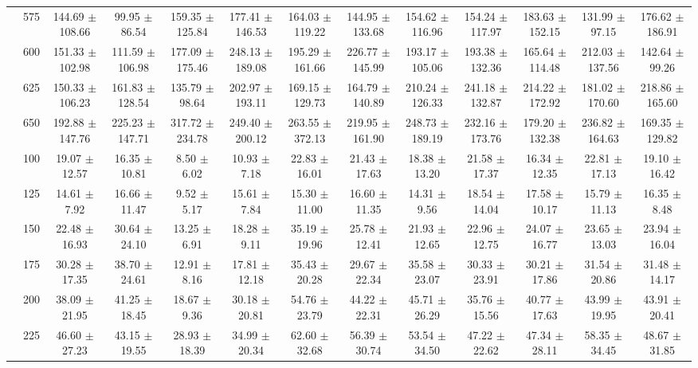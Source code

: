 \begin{table}[h]
{\begin{tabular}{
        ccccccccccccc}
 & 575& 144.69 $\pm$ 108.66& 99.95 $\pm$ 86.54& 159.35 $\pm$ 125.84& 177.41 $\pm$ 146.53& 164.03 $\pm$ 119.22& 144.95 $\pm$ 133.68& 154.62 $\pm$ 116.96& 154.24 $\pm$ 117.97& 183.63 $\pm$ 152.15& 131.99 $\pm$ 97.15& 176.62 $\pm$ 186.91 \\ 
 & 600& 151.33 $\pm$ 102.98& 111.59 $\pm$ 106.98& 177.09 $\pm$ 175.46& 248.13 $\pm$ 189.08& 195.29 $\pm$ 161.66& 226.77 $\pm$ 145.99& 193.17 $\pm$ 105.06& 193.38 $\pm$ 132.36& 165.64 $\pm$ 114.48& 212.03 $\pm$ 137.56& 142.64 $\pm$ 99.26 \\ 
 & 625& 150.33 $\pm$ 106.23& 161.83 $\pm$ 128.54& 135.79 $\pm$ 98.64& 202.97 $\pm$ 193.11& 169.15 $\pm$ 129.73& 164.79 $\pm$ 140.89& 210.24 $\pm$ 126.33& 241.18 $\pm$ 132.87& 214.22 $\pm$ 172.92& 181.02 $\pm$ 170.60& 218.86 $\pm$ 165.60 \\ 
 & 650& 192.88 $\pm$ 147.76& 225.23 $\pm$ 147.71& 317.72 $\pm$ 234.78& 249.40 $\pm$ 200.12& 263.55 $\pm$ 372.13& 219.95 $\pm$ 161.90& 248.73 $\pm$ 189.19& 232.16 $\pm$ 173.76& 179.20 $\pm$ 132.38& 236.82 $\pm$ 164.63& 169.35 $\pm$ 129.82 \\ \hline 
 & 100& 19.07 $\pm$ 12.57& 16.35 $\pm$ 10.81& 8.50 $\pm$ 6.02& 10.93 $\pm$ 7.18& 22.83 $\pm$ 16.01& 21.43 $\pm$ 17.63& 18.38 $\pm$ 13.20& 21.58 $\pm$ 17.37& 16.34 $\pm$ 12.35& 22.81 $\pm$ 17.13& 19.10 $\pm$ 16.42 \\ 
 & 125& 14.61 $\pm$ 7.92& 16.66 $\pm$ 11.47& 9.52 $\pm$ 5.17& 15.61 $\pm$ 7.84& 15.30 $\pm$ 11.00& 16.60 $\pm$ 11.35& 14.31 $\pm$ 9.56& 18.54 $\pm$ 14.04& 17.58 $\pm$ 10.17& 15.79 $\pm$ 11.13& 16.35 $\pm$ 8.48 \\ 
 & 150& 22.48 $\pm$ 16.93& 30.64 $\pm$ 24.10& 13.25 $\pm$ 6.91& 18.28 $\pm$ 9.11& 35.19 $\pm$ 19.96& 25.78 $\pm$ 12.41& 21.93 $\pm$ 12.65& 22.96 $\pm$ 12.75& 24.07 $\pm$ 16.77& 23.65 $\pm$ 13.03& 23.94 $\pm$ 16.04 \\ 
 & 175& 30.28 $\pm$ 17.35& 38.70 $\pm$ 24.61& 12.91 $\pm$ 8.16& 17.81 $\pm$ 12.18& 35.43 $\pm$ 20.28& 29.67 $\pm$ 22.34& 35.58 $\pm$ 23.07& 30.33 $\pm$ 23.91& 30.21 $\pm$ 17.86& 31.54 $\pm$ 20.86& 31.48 $\pm$ 14.17 \\ 
 & 200& 38.09 $\pm$ 21.95& 41.25 $\pm$ 18.45& 18.67 $\pm$ 9.36& 30.18 $\pm$ 20.81& 54.76 $\pm$ 23.79& 44.22 $\pm$ 22.31& 45.71 $\pm$ 26.29& 35.76 $\pm$ 15.56& 40.77 $\pm$ 17.63& 43.99 $\pm$ 19.95& 43.91 $\pm$ 20.41 \\ 
 & 225& 46.60 $\pm$ 27.23& 43.15 $\pm$ 19.55& 28.93 $\pm$ 18.39& 34.99 $\pm$ 20.34& 62.60 $\pm$ 32.68& 56.39 $\pm$ 30.74& 53.54 $\pm$ 34.50& 47.22 $\pm$ 22.62& 47.34 $\pm$ 28.11& 58.35 $\pm$ 34.45& 48.67 $\pm$ 31.85 \\ 

\end{tabular}}
\end{table}
